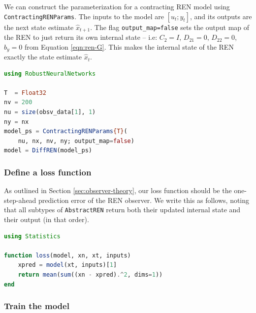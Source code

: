 We can construct the parameterization for a contracting REN model using \verb|ContractingRENParams|. The inputs to the model are $[u_t;y_t]$, and its outputs are the next state estimate $\hat{x}_{t+1}$. The flag \verb|output_map=false| sets the output map of the REN to just return its own internal state -- i.e: $C_2 = I$, $D_{21} = 0$, $D_{22} = 0$, $b_y = 0$ from Equation \ref{eqn:ren-G}. This makes the internal state of the REN exactly the state estimate $\hat{x}_t$.

\begin{lstlisting}[language = Julia]
using RobustNeuralNetworks

T  = Float32
nv = 200
nu = size(obsv_data[1], 1)
ny = nx
model_ps = ContractingRENParams{T}(
    nu, nx, nv, ny; output_map=false)
model = DiffREN(model_ps)
\end{lstlisting}

\subsubsection{Define a loss function} \label{sec:observer-loss}

As outlined in Section \ref{sec:observer-theory}, our loss function should be the one-step-ahead prediction error of the REN observer. We write this as follows, noting that all subtypes of \verb|AbstractREN| return both their updated internal state and their output (in that order).
\begin{lstlisting}[language = Julia]
using Statistics

function loss(model, xn, xt, inputs)
    xpred = model(xt, inputs)[1]
    return mean(sum((xn - xpred).^2, dims=1))
end
\end{lstlisting}

\subsubsection{Train the model} \label{sec:observer-train}

